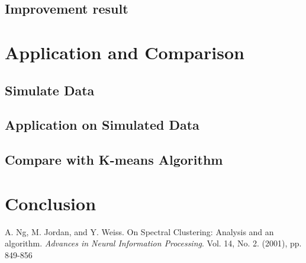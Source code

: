 \documentclass[11pt]{article}
\begin{document}
\subsection{Improvement result}


\section{Application and Comparison}
\subsection{Simulate Data}

\subsection{Application on Simulated Data}
\subsection{Compare with K-means Algorithm}



\section{Conclusion}

%
%


\newpage
\begin{thebibliography}{9}



A. Ng, M. Jordan, and Y. Weiss.
On Spectral Clustering: Analysis and an algorithm.
\textit{Advances in Neural Information Processing}.
Vol. 14, No. 2. (2001), pp. 849-856 

\end{thebibliography}
\end{document}

